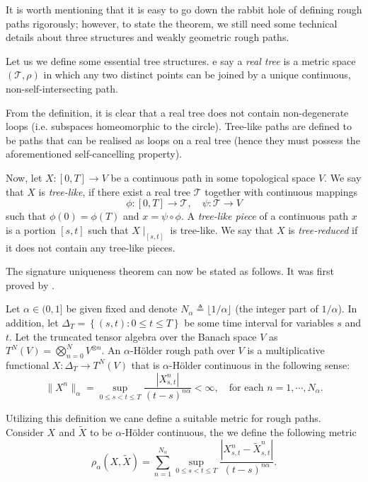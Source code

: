 It is worth mentioning that it is easy to go down the rabbit hole of defining rough paths rigorously; however, to state the theorem, we still need some technical details about three structures and weakly geometric rough paths.

Let us we define some essential tree structures.
e say a \textit{real tree} is a metric space $(\mathcal{T}, \rho)$ in which any two distinct points can be joined by a unique continuous, non-self-intersecting path.

From the definition, it is clear that a real tree does not contain non-degenerate loops (i.e. subspaces homeomorphic to the circle). Tree-like paths are defined to be paths that can be realised as loops on a real tree (hence they must possess the aforementioned self-cancelling property).


Now, let $X : [0, T] \to V$ be a continuous path in some topological space $V$. We say that $X$ is \textit{tree-like}, if there exist a real tree $\mathcal{T}$ together with continuous mappings
\[
\phi : [0, T] \to \mathcal{T}, \quad \psi : \mathcal{T} \to V
\]
such that $\phi(0) = \phi(T)$ and $x = \psi \circ \phi$. A \textit{tree-like piece} of a continuous path $x$ is a portion $[s, t]$ such that $X\mid_{[s,t]}$ is tree-like. We say that $X$ is \textit{tree-reduced} if it does not contain any tree-like pieces.


The signature uniqueness theorem can now be stated as follows. It was first
proved by \cite{boedihardjo2016signature}.


Let $\alpha \in (0,1]$ be given fixed and denote $N_{\alpha} \triangleq \lfloor 1/\alpha \rfloor$ (the integer part of $1/\alpha$). In addition, let $\Delta _{T} = \left\{ ( s,t) : 0 \le t \le T \right\} $ be some time interval for variables $s $
and $t$. Let the truncated tensor algebra over the Banach space $V$ as $T^{N}( V) = \bigotimes_{n= 0} ^{N} V^{ \otimes n}  $.     An $\alpha$-Hölder rough path over $V$ is a multiplicative functional $X : \Delta_T \to T_{}^N(V)$ that is $\alpha$-Hölder continuous in the following sense:
\[
\|X^n\|_{\alpha} =  \sup_{0 \leq s < t \leq T} \frac{|X_{s,t}^n|}{(t-s)^{n\alpha}} < \infty, \quad \text{for each } n = 1, \cdots, N_{\alpha}.
\]

Utilizing this definition we cane define a suitable metric for rough paths. Consider $X_{}$ and $\widetilde{X}$ to be $\alpha$-Hölder continuous, the we define the following metric \begin{equation}
\rho _{\alpha }( X, \widetilde{X})  = \sum_{n=1}^{N_{\alpha }} \sup_{0 \le s < t \le T  } \frac{| X_{s,t}^{n} - \widetilde{X}_{s,t}^{n}  |   }{( t -s)^{n\alpha } }.
\end{equation}

